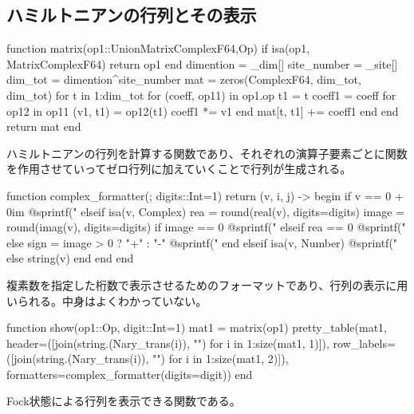 \documentclass{ltjsarticle}
\begin{document}
\subsection*{ハミルトニアンの行列とその表示}
\begin{jllisting}
function matrix(op1::Union{Matrix{ComplexF64},Op})
  if isa(op1, Matrix{ComplexF64})
    return op1
  end
  dimention = _dim[]
  site_number = _site[]
  dim_tot = dimention^site_number
  mat = zeros(ComplexF64, dim_tot, dim_tot)
  for t in 1:dim_tot
    for (coeff, op11) in op1.op
      t1 = t
      coeff1 = coeff
      for op12 in op11
        (v1, t1) = op12(t1)
        coeff1 *= v1
      end
      mat[t, t1] += coeff1
    end
  end
  return mat
end
\end{jllisting}
ハミルトニアンの行列を計算する関数であり、それぞれの演算子要素ごとに関数を作用させていってゼロ行列に加えていくことで行列が生成される。\\
\begin{jllisting}
function complex_formatter(; digits::Int=1)
  return (v, i, j) -> begin
    if v == 0 + 0im
      @sprintf("%
    elseif isa(v, Complex)
      rea = round(real(v), digits=digits)
      image = round(imag(v), digits=digits)
      if image == 0
        @sprintf("%
      elseif rea == 0
        @sprintf("%
      else
        sign = image > 0 ? "+" : "-"
        @sprintf("%
      end
    elseif isa(v, Number)
      @sprintf("%
    else
      string(v)
    end
  end
end
\end{jllisting}
複素数を指定した桁数で表示させるためのフォーマットであり、行列の表示に用いられる。中身はよくわかっていない。\\
\begin{jllisting}
function show(op1::Op, digit::Int=1)
  mat1 = matrix(op1)
  pretty_table(mat1, header=([join(string.(Nary_trans(i)), "") for i in 1:size(mat1, 1)]), row_labels=([join(string.(Nary_trans(i)), "") for i in 1:size(mat1, 2)]), formatters=complex_formatter(digits=digit))
end
\end{jllisting}
Fock状態による行列を表示できる関数である。\\
\end{document}
